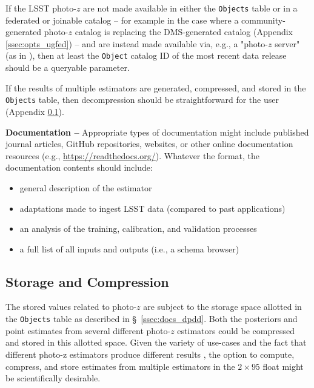 \documentclass[DM,lsstdraft,toc]{lsstdoc}
\begin{document}
If the LSST photo-$z$ are not made available in either the {\tt Objects} table or in a federated or joinable catalog -- for example in the case where a community-generated photo-$z$ catalog is replacing the DMS-generated catalog (Appendix \ref{ssec:opts_ugfed}) -- and are instead made available via, e.g., a "photo-$z$ server" (as in \cite{2018A&C....25...58G}), then at least the {\tt Object} catalog ID of the most recent data release should be a queryable parameter.

If the results of multiple estimators are generated, compressed, and stored in the {\tt Objects} table, then decompression should be straightforward for the user (Appendix \ref{ssec:dp_store}).

{\bf Documentation --} 
Appropriate types of documentation might include published journal articles, GitHub repositories, websites, or other online documentation resources (e.g., \url{https://readthedocs.org/}). Whatever the format, the documentation contents should include: 
\vspace{-15pt}
\begin{itemize}
\item general description of the estimator
\item adaptations made to ingest LSST data (compared to past applications)
\item an analysis of the training, calibration, and validation processes
\item a full list of all inputs and outputs (i.e., a schema browser)
\end{itemize}

\subsection{Storage and Compression}\label{ssec:dp_store}

The stored values related to photo-$z$ are subject to the storage space allotted in the {\tt Objects} table as described in \S~\ref{ssec:docs_dpdd}.
Both the posteriors and point estimates from several different photo-$z$ estimators could be compressed and stored in this allotted space.
Given the variety of use-cases and the fact that different photo-z estimators produce different results \citep{2020arXiv200103621S}, the option to compute, compress, and store estimates from multiple estimators in the $2\times95$ float might be scientifically desirable.
\end{document}
